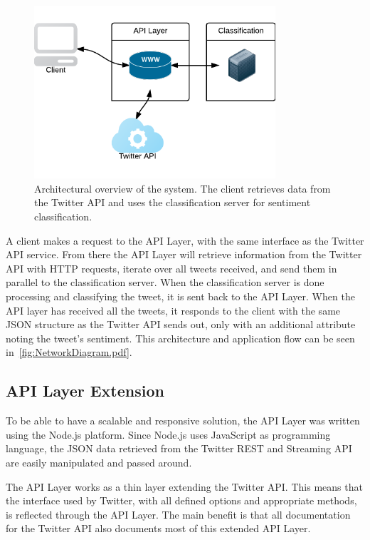 \begin{figure}[ht]
 \begin{center}
     \includegraphics[width=0.8\textwidth]{../img/NetworkDiagram.pdf}
 \end{center}
 \caption[Architectural overview of the system.]{Architectural overview of the system. The client retrieves data from the Twitter API and uses the classification server for sentiment classification.}
 \label{fig:NetworkDiagram.pdf}
\end{figure}

A client makes a request to the API Layer, with the same interface as the Twitter API service. From there the API Layer will retrieve information from the Twitter API with HTTP requests, iterate over all tweets received, and send them in parallel to the classification server. When the classification server is done processing and classifying the tweet, it is sent back to the API Layer. When the API layer has received all the tweets, it responds to the client with the same JSON structure as the Twitter API sends out, only with an additional attribute noting the tweet's sentiment. This architecture and application flow can be seen in~\autoref{fig:NetworkDiagram.pdf}. 

\subsection{API Layer Extension}

To be able to have a scalable and responsive solution, the API Layer was written using the Node.js platform. Since Node.js uses JavaScript as programming language, the JSON data retrieved from the Twitter REST and Streaming API are easily manipulated and passed around. 

The API Layer works as a thin layer extending the Twitter API. This means that the interface used by Twitter, with all defined options and appropriate methods, is reflected through the API Layer. The main benefit is that all documentation for the Twitter API also documents most of this extended API Layer.

